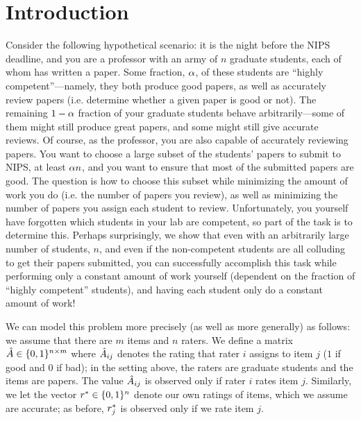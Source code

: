 \section{Introduction}

Consider the following hypothetical scenario: it is the night before the 
NIPS deadline, and you are a professor with an army of $n$ graduate students, 
each of whom has written a paper.  Some fraction, $\alpha$, of these 
students are ``highly competent''---namely, they both produce good papers, as 
well as accurately review papers (i.e. determine whether a given paper is good 
or not).  The remaining $1-\alpha$ fraction of your graduate students 
behave arbitrarily---some of them might still produce great papers, and some 
might still give accurate reviews.  Of course, as the professor, you are also 
capable of accurately reviewing papers.  You want to choose a large subset of 
the students' papers to submit to NIPS, at least $\alpha n$, and you want 
to ensure that most of the submitted papers are good.  The question is how to 
choose this subset while minimizing the amount of work you do (i.e. the number 
of papers you review), as well as minimizing the number of papers you assign 
each student to review. Unfortunately, you yourself have forgotten which students 
in your lab are competent, so part of the task is to determine this.
%
Perhaps surprisingly, we show that even with an arbitrarily large number of 
students, $n$, and even if the non-competent students are all colluding to 
get their papers submitted, you can successfully accomplish this task while 
performing only a constant amount of work yourself (dependent on the fraction 
of ``highly competent'' students), and having each student only do a constant 
amount of work!

We can model this problem more precisely (as well as more generally) as follows: 
we assume that there are $m$ items and $n$ raters. We define a matrix 
$\hat{A} \in \{0,1\}^{n \times m}$ where $\hat{A}_{ij}$ denotes the rating that 
rater $i$ assigns to item $j$ ($1$ if good and $0$ if bad); in the setting above, 
the raters are graduate students and the items are papers. 
The value $\hat{A}_{ij}$ is observed only if rater $i$ rates item $j$. 
Similarly, we let the vector $r^* \in \{0,1\}^n$ denote 
our own ratings of items, which we assume are accurate; as before, 
$r^*_{j}$ is observed only if we rate item $j$.

